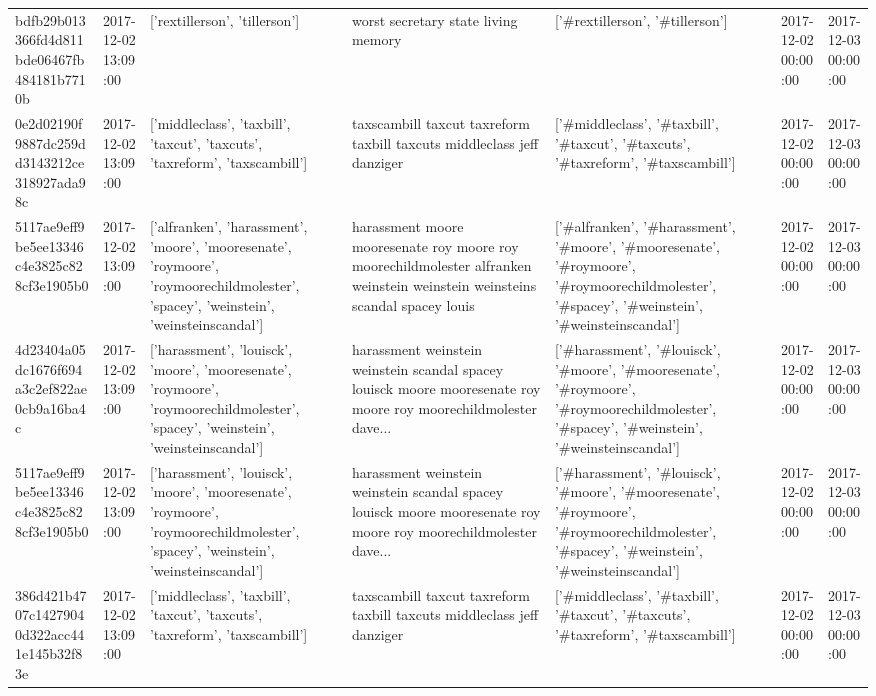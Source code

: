 \begin{tabular}{lllllll}
bdfb29b013366fd4d811bde06467fb484181b7710b & 2017-12-02 13:09:00 & ['rextillerson', 'tillerson'] & worst secretary state living memory & ['#rextillerson', '#tillerson'] & 2017-12-02 00:00:00 & 2017-12-03 00:00:00 \\
0e2d02190f9887dc259dd3143212ce318927ada98c & 2017-12-02 13:09:00 & ['middleclass', 'taxbill', 'taxcut', 'taxcuts', 'taxreform', 'taxscambill'] & taxscambill taxcut taxreform taxbill taxcuts middleclass jeff danziger & ['#middleclass', '#taxbill', '#taxcut', '#taxcuts', '#taxreform', '#taxscambill'] & 2017-12-02 00:00:00 & 2017-12-03 00:00:00 \\
5117ae9eff9be5ee13346c4e3825c828cf3e1905b0 & 2017-12-02 13:09:00 & ['alfranken', 'harassment', 'moore', 'mooresenate', 'roymoore', 'roymoorechildmolester', 'spacey', 'weinstein', 'weinsteinscandal'] & harassment moore mooresenate roy moore roy moorechildmolester alfranken weinstein weinstein weinsteins scandal spacey louis & ['#alfranken', '#harassment', '#moore', '#mooresenate', '#roymoore', '#roymoorechildmolester', '#spacey', '#weinstein', '#weinsteinscandal'] & 2017-12-02 00:00:00 & 2017-12-03 00:00:00 \\
4d23404a05dc1676f694a3c2ef822ae0cb9a16ba4c & 2017-12-02 13:09:00 & ['harassment', 'louisck', 'moore', 'mooresenate', 'roymoore', 'roymoorechildmolester', 'spacey', 'weinstein', 'weinsteinscandal'] & harassment weinstein weinstein scandal spacey louisck moore mooresenate roy moore roy moorechildmolester dave... & ['#harassment', '#louisck', '#moore', '#mooresenate', '#roymoore', '#roymoorechildmolester', '#spacey', '#weinstein', '#weinsteinscandal'] & 2017-12-02 00:00:00 & 2017-12-03 00:00:00 \\
5117ae9eff9be5ee13346c4e3825c828cf3e1905b0 & 2017-12-02 13:09:00 & ['harassment', 'louisck', 'moore', 'mooresenate', 'roymoore', 'roymoorechildmolester', 'spacey', 'weinstein', 'weinsteinscandal'] & harassment weinstein weinstein scandal spacey louisck moore mooresenate roy moore roy moorechildmolester dave... & ['#harassment', '#louisck', '#moore', '#mooresenate', '#roymoore', '#roymoorechildmolester', '#spacey', '#weinstein', '#weinsteinscandal'] & 2017-12-02 00:00:00 & 2017-12-03 00:00:00 \\
386d421b4707c14279040d322acc441e145b32f83e & 2017-12-02 13:09:00 & ['middleclass', 'taxbill', 'taxcut', 'taxcuts', 'taxreform', 'taxscambill'] & taxscambill taxcut taxreform taxbill taxcuts middleclass jeff danziger & ['#middleclass', '#taxbill', '#taxcut', '#taxcuts', '#taxreform', '#taxscambill'] & 2017-12-02 00:00:00 & 2017-12-03 00:00:00 \\

\end{tabular}
